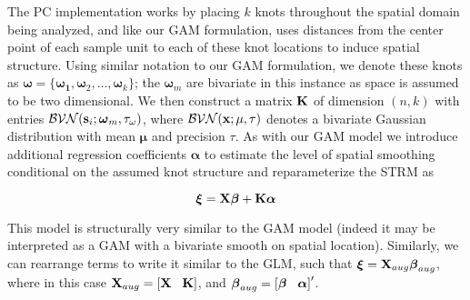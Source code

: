 \documentclass[12pt,fleqn]{article}
\begin{document}
\begin{flushleft}
The PC implementation works by placing $k$ knots throughout the spatial domain being analyzed, and like our GAM formulation, uses distances from the center point of each sample unit to each of these knot locations to induce spatial structure.  Using similar notation to our GAM formulation, we denote these knots as $\boldsymbol{\omega} = \{ \boldsymbol{\omega_{1}},\boldsymbol{\omega}_{2},\hdots,\boldsymbol{\omega}_{k} \}$; the $\boldsymbol{\omega}_m$ are bivariate in this  instance as space is assumed to be two dimensional.  We then construct a matrix ${\bf K}$ of dimension $(n,k)$ with entries $\mathcal{BVN}({\bf s}_i;\boldsymbol{\omega}_m,\tau_{\omega})$, where $\mathcal{BVN}({\bf x};{\bf \mu},\tau)$ denotes a bivariate Gaussian distribution with mean $\boldsymbol{\mu}$ and precision $\tau$.  As with our GAM model we introduce additional regression coefficients $\boldsymbol{\alpha}$ to estimate the level of spatial smoothing conditional on the assumed knot structure and reparameterize the STRM as
\begin{linenomath*}
\begin{equation}
  \label{eq:PC}
  \boldsymbol{\xi}={\bf X} \boldsymbol{\beta} + {\bf K} \boldsymbol{\alpha}
\end{equation}
\end{linenomath*}
This model is structurally very similar to the GAM model (indeed it may be interpreted as a GAM with a bivariate smooth on spatial location).  Similarly, we can rearrange terms to write it similar to the GLM, such that
$\boldsymbol{\xi}={\bf X}_{aug} \boldsymbol{\beta}_{aug}$,
where in this case ${\bf X}_{aug} = \left[ {\bf X} \hspace{3mm} {\bf K} \right]$, and $\boldsymbol{\beta}_{aug}=\left[  \boldsymbol{\beta} \hspace{3mm} \boldsymbol{\alpha} \right] ^\prime$.


\end{flushleft}
\end{document}
